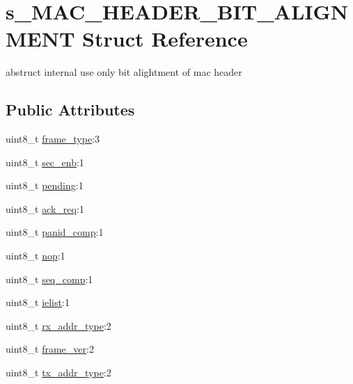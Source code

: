 \hypertarget{structs__MAC__HEADER__BIT__ALIGNMENT}{\section{s\+\_\+\+M\+A\+C\+\_\+\+H\+E\+A\+D\+E\+R\+\_\+\+B\+I\+T\+\_\+\+A\+L\+I\+G\+N\+M\+E\+N\+T Struct Reference}
\label{structs__MAC__HEADER__BIT__ALIGNMENT}
}


abstruct internal use only bit alightment of mac header  


\subsection*{Public Attributes}
\begin{DoxyCompactItemize}
\item 
uint8\+\_\+t \hyperlink{structs__MAC__HEADER__BIT__ALIGNMENT_afb182d956f1da78ffa493ff0a15126dc}{frame\+\_\+type}\+:3
\item 
uint8\+\_\+t \hyperlink{structs__MAC__HEADER__BIT__ALIGNMENT_a5efd7ca5355864913f9e33b94405c1aa}{sec\+\_\+enb}\+:1
\item 
uint8\+\_\+t \hyperlink{structs__MAC__HEADER__BIT__ALIGNMENT_a1f9a810fd0ce7bef6416eaff105738d1}{pending}\+:1
\item 
uint8\+\_\+t \hyperlink{structs__MAC__HEADER__BIT__ALIGNMENT_a7f63e43e8d42a4b81d35108889b4132f}{ack\+\_\+req}\+:1
\item 
uint8\+\_\+t \hyperlink{structs__MAC__HEADER__BIT__ALIGNMENT_a38564ee3f7e5df1ceca39cdbcac6df00}{panid\+\_\+comp}\+:1
\item 
uint8\+\_\+t \hyperlink{structs__MAC__HEADER__BIT__ALIGNMENT_a571538a42c471e5ced1fb037ca80b7ae}{nop}\+:1
\item 
uint8\+\_\+t \hyperlink{structs__MAC__HEADER__BIT__ALIGNMENT_affa4a8c6ea9d776864ed31bcb205b142}{seq\+\_\+comp}\+:1
\item 
uint8\+\_\+t \hyperlink{structs__MAC__HEADER__BIT__ALIGNMENT_a851e8afd28db4847bea485ed9919e1ed}{ielist}\+:1
\item 
uint8\+\_\+t \hyperlink{structs__MAC__HEADER__BIT__ALIGNMENT_a6ef6c8641feae048db93f7767dbf0888}{rx\+\_\+addr\+\_\+type}\+:2
\item 
uint8\+\_\+t \hyperlink{structs__MAC__HEADER__BIT__ALIGNMENT_a3f362f5fa949d8b40db9ad1d21c54c73}{frame\+\_\+ver}\+:2
\item 
uint8\+\_\+t \hyperlink{structs__MAC__HEADER__BIT__ALIGNMENT_a4692ebd08b152a204045c58a45f2ad33}{tx\+\_\+addr\+\_\+type}\+:2
\end{DoxyCompactItemize}


